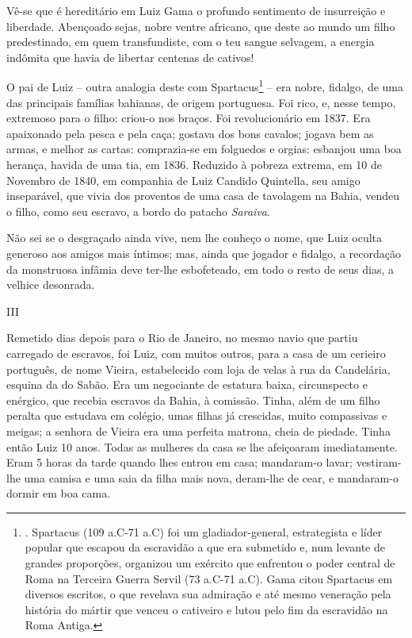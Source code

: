 Vê-se que é hereditário em Luiz Gama o profundo sentimento de
insurreição e liberdade. Abençoado sejas, nobre ventre africano, que
deste ao mundo um filho predestinado, em quem transfundiste, com o teu
sangue selvagem, a energia indômita que havia de libertar centenas de
cativos!

O pai de Luiz -- outra analogia deste com Spartacus\footnote{. Spartacus
  (109 a.C-71 a.C) foi um gladiador-general, estrategista e líder
  popular que escapou da escravidão a que era submetido e, num levante
  de grandes proporções, organizou um exército que enfrentou o poder
  central de Roma na Terceira Guerra Servil (73 a.C-71 a.C). Gama citou
  Spartacus em diversos escritos, o que revelava sua admiração e até
  mesmo veneração pela história do mártir que venceu o cativeiro e lutou
  pelo fim da escravidão na Roma Antiga.} -- era nobre, fidalgo, de uma
das principais famílias bahianas, de origem portuguesa. Foi rico, e,
nesse tempo, extremoso para o filho: criou-o nos braços. Foi
revolucionário em 1837. Era apaixonado pela pesca e pela caça; gostava
dos bons cavalos; jogava bem as armas, e melhor as cartas: comprazia-se
em folguedos e orgias: esbanjou uma boa herança, havida de uma tia, em
1836. Reduzido à pobreza extrema, em 10 de Novembro de 1840, em
companhia de Luiz Candido Quintella, seu amigo inseparável, que vivia
dos proventos de uma casa de tavolagem na Bahia, vendeu o filho, como
seu escravo, a bordo do patacho \emph{Saraiva}.

Não sei se o desgraçado ainda vive, nem lhe conheço o nome, que Luiz
oculta generoso aos amigos mais íntimos; mas, ainda que jogador e
fidalgo, a recordação da monstruosa infâmia deve ter-lhe esbofeteado, em
todo o resto de seus dias, a velhice desonrada.

III

Remetido dias depois para o Rio de Janeiro, no mesmo navio que partiu
carregado de escravos, foi Luiz, com muitos outros, para a casa de um
cerieiro português, de nome Vieira, estabelecido com loja de velas à rua
da Candelária, esquina da do Sabão. Era um negociante de estatura baixa,
circunspecto e enérgico, que recebia escravos da Bahia, à comissão.
Tinha, além de um filho peralta que estudava em colégio, umas filhas já
crescidas, muito compassivas e meigas; a senhora de Vieira era uma
perfeita matrona, cheia de piedade. Tinha então Luiz 10 anos. Todas as
mulheres da casa se lhe afeiçoaram imediatamente. Eram 5 horas da tarde
quando lhes entrou em casa; mandaram-o lavar; vestiram-lhe uma camisa e
uma saia da filha mais nova, deram-lhe de cear, e mandaram-o dormir em
boa cama.

